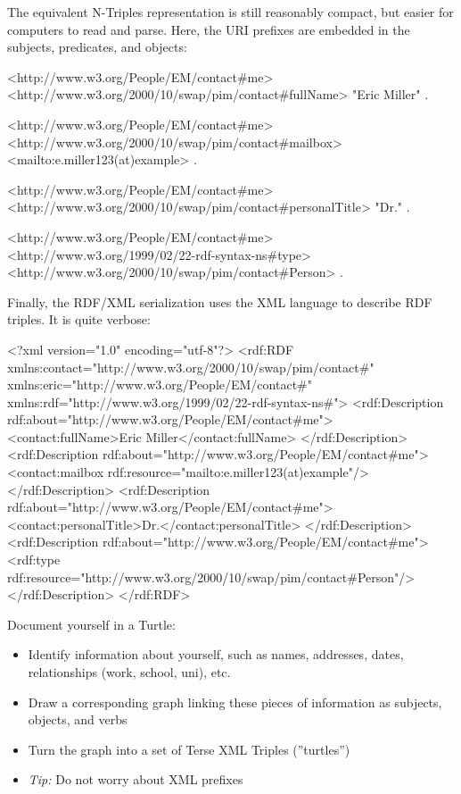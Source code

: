 \noindent The equivalent N-Triples representation is still reasonably compact, but easier for computers to read and parse. Here, the URI prefixes are embedded in the subjects, predicates, and objects:

\begin{textcode}
<http://www.w3.org/People/EM/contact#me> 
 <http://www.w3.org/2000/10/swap/pim/contact#fullName> 
  "Eric Miller" .

<http://www.w3.org/People/EM/contact#me>
 <http://www.w3.org/2000/10/swap/pim/contact#mailbox> 
  <mailto:e.miller123(at)example> .

<http://www.w3.org/People/EM/contact#me>
 <http://www.w3.org/2000/10/swap/pim/contact#personalTitle> 
  "Dr." .
 
<http://www.w3.org/People/EM/contact#me>
 <http://www.w3.org/1999/02/22-rdf-syntax-ns#type>
  <http://www.w3.org/2000/10/swap/pim/contact#Person> .
\end{textcode}

\noindent Finally, the RDF/XML serialization uses the XML language to describe RDF triples. It is quite verbose: 

\begin{xmlcode}
<?xml version="1.0" encoding="utf-8"?>
<rdf:RDF xmlns:contact="http://www.w3.org/2000/10/swap/pim/contact#" 
xmlns:eric="http://www.w3.org/People/EM/contact#" 
xmlns:rdf="http://www.w3.org/1999/02/22-rdf-syntax-ns#">
  <rdf:Description rdf:about="http://www.w3.org/People/EM/contact#me">
    <contact:fullName>Eric Miller</contact:fullName>
  </rdf:Description>
  <rdf:Description rdf:about="http://www.w3.org/People/EM/contact#me">
    <contact:mailbox rdf:resource="mailto:e.miller123(at)example"/>
  </rdf:Description>
  <rdf:Description rdf:about="http://www.w3.org/People/EM/contact#me">
    <contact:personalTitle>Dr.</contact:personalTitle>
  </rdf:Description>
  <rdf:Description rdf:about="http://www.w3.org/People/EM/contact#me">
    <rdf:type rdf:resource="http://www.w3.org/2000/10/swap/pim/contact#Person"/>
  </rdf:Description>
</rdf:RDF>
\end{xmlcode}

\begin{exerciseboxpaper}

Document yourself in a Turtle:
\begin{itemize}
	\item Identify information about yourself, such as names, addresses, dates, relationships (work, school, uni), etc.
	\item Draw a corresponding graph linking these pieces of information as subjects, objects, and verbs
	\item Turn the graph into a set of Terse XML Triples (''turtles'')
	\item \emph{Tip:} Do not worry about XML prefixes
\end{itemize}
\end{exerciseboxpaper}

